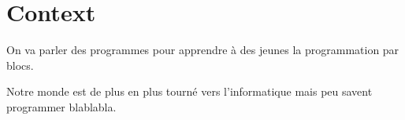 \section{Context}
On va parler des programmes pour apprendre à des jeunes la programmation par blocs.

Notre monde est de plus en plus tourné vers l'informatique mais peu savent programmer blablabla.
